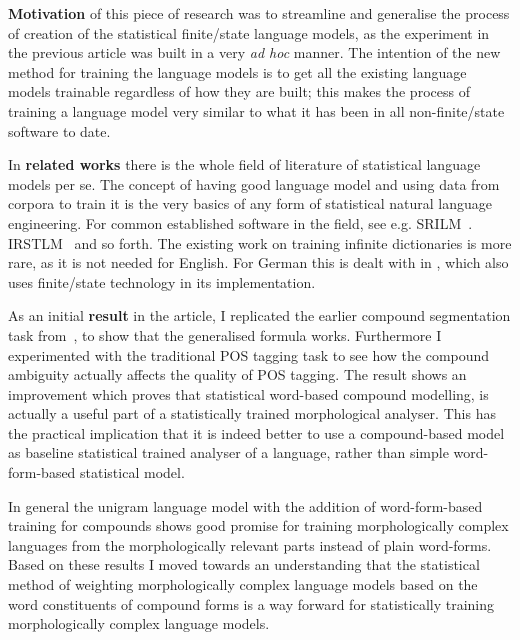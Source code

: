 \documentclass[officiallayout]{unihelcompling}
\begin{document}
\textbf{Motivation} of this piece of research was to streamline and generalise
the process of creation of the statistical finite\-/state language models, as the
experiment in the previous article  was built
in a very \emph{ad hoc} manner. The intention of the new method for training the
language models is to get all the existing language models trainable regardless
of how they are built; this makes the process of training a language model very
similar to what it has been in all non-finite\-/state software to date.

In \textbf{related works} there is the whole field of literature of statistical
language models per se. The concept of having good language model and using
data from corpora to train it is the very basics of any form of statistical
natural language engineering. For common established software in the field, see
e.g.  SRILM~\citep{stolcke2002srilm}. IRSTLM~\citep{federico2008irstlm} and so
forth.  The existing work on training infinite dictionaries is more rare, as it
is not needed for English. For German this is dealt with in
\citep{schiller2006german}, which also uses finite\-/state technology in its
implementation.

As an initial \textbf{result} in the article, I replicated the earlier compound
segmentation task from~, to show that the generalised formula works.
Furthermore I experimented with the traditional POS tagging task to see how the
compound ambiguity actually affects the quality of POS tagging. The result
shows an improvement which proves that statistical word-based compound
modelling, is actually a useful part of a statistically trained morphological
analyser. This has the practical implication that it is indeed better to
use a compound-based model as baseline statistical trained analyser
of a language, rather than simple word-form-based statistical model.

In general the unigram language model with the addition of word-form-based
training for compounds shows good promise for training
morphologically complex languages from the morphologically relevant parts
instead of plain word-forms. Based on these results I moved towards an 
understanding that the statistical method of weighting morphologically complex
language models based on the word constituents of compound forms is a way 
forward for statistically training morphologically complex language models.
\end{document}
